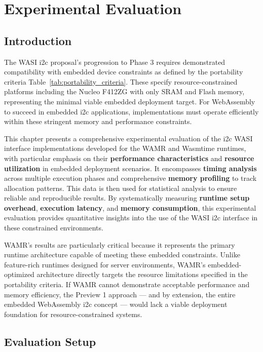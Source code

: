\chapter{Experimental Evaluation}
\label{chap:eval}

\section{Introduction}
\label{sec:eval-intro}

The WASI \acrshort{i2c} proposal's progression to Phase 3 requires demonstrated compatibility with embedded device constraints as defined by the portability criteria Table~\ref{tab:portability_criteria}. These specify resource-constrained platforms including the Nucleo F412ZG with only  SRAM and  Flash memory, representing the minimal viable embedded deployment target. For WebAssembly to succeed in embedded \acrshort{i2c} applications, implementations must operate efficiently within these stringent memory and performance constraints.

This chapter presents a comprehensive experimental evaluation of the \acrshort{i2c} WASI interface implementations developed for the WAMR and Wasmtime runtimes, with particular emphasis on their \textbf{performance characteristics} and \textbf{resource utilization} in embedded deployment scenarios. It encompasses \textbf{timing analysis} across multiple execution phases and comprehensive \textbf{memory profiling} to track allocation patterns. This data is then used for statistical analysis to ensure reliable and reproducible results. By systematically measuring \textbf{runtime setup overhead}, \textbf{execution latency}, and \textbf{memory consumption}, this experimental evaluation provides quantitative insights into the use of the WASI \acrshort{i2c} interface in these constrained environments.

WAMR's results are particularly critical because it represents the primary runtime architecture capable of meeting these embedded constraints. Unlike feature-rich runtimes designed for server environments, WAMR's embedded-optimized architecture directly targets the resource limitations specified in the portability criteria. If WAMR cannot demonstrate acceptable performance and memory efficiency, the Preview 1 approach --- and by extension, the entire embedded WebAssembly \acrshort{i2c} concept --- would lack a viable deployment foundation for resource-constrained systems.

\section{Evaluation Setup}
\label{sec:eval-methodology}

